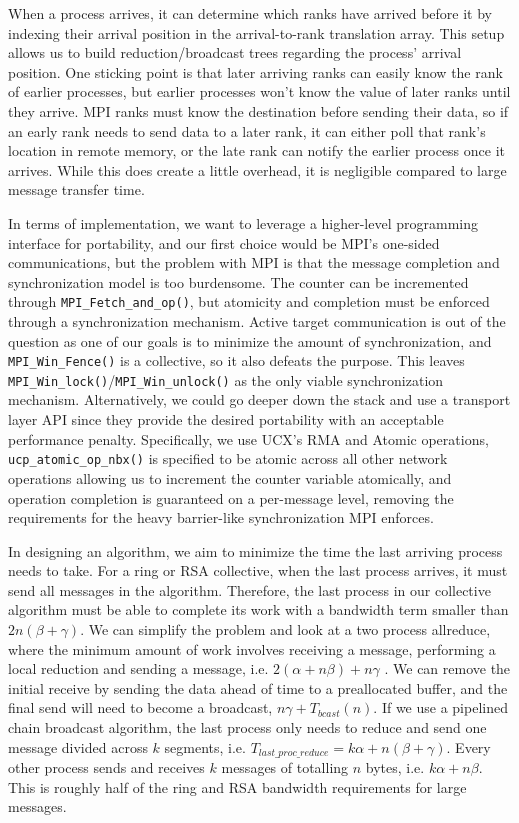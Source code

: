 When a process arrives, it can determine which ranks have arrived before it by indexing their arrival position in the arrival-to-rank translation array.
This setup allows us to build reduction/broadcast trees regarding the process' arrival position.
One sticking point is that later arriving ranks can easily know the rank of earlier processes, but earlier processes won't know the value of later ranks until they arrive.
MPI ranks must know the destination before sending their data, so if an early rank needs to send data to a later rank, it can either poll that rank's location in remote memory, or the late rank can notify the earlier process once it arrives.
While this does create a little overhead, it is negligible compared to large message transfer time.

In terms of implementation, we want to leverage a higher-level programming interface for portability, and our first choice would be MPI's one-sided communications, but the problem with MPI is that the message completion and synchronization model is too burdensome. 
The counter can be incremented through \texttt{MPI\_Fetch\_and\_op()}, but atomicity and completion must be enforced through a synchronization mechanism. 
Active target communication is out of the question as one of our goals is to minimize the amount of synchronization, and \texttt{MPI\_Win\_Fence()} is a collective, so it also defeats the purpose.
This leaves \texttt{MPI\_Win\_lock()}/\texttt{MPI\_Win\_unlock()} as the only viable synchronization mechanism.
Alternatively, we could go deeper down the stack and use a transport layer API since they provide the desired portability with an acceptable performance penalty.
Specifically, we use UCX's RMA and Atomic operations, \texttt{ucp\_atomic\_op\_nbx()} is specified to be atomic across all other network operations allowing us to increment the counter variable atomically, and operation completion is guaranteed on a per-message level, removing the requirements for the heavy barrier-like synchronization MPI enforces.

In designing an algorithm, we aim to minimize the time the last arriving process needs to take.
For a ring or RSA collective, when the last process arrives, it must send all messages in the algorithm.
Therefore, the last process in our collective algorithm must be able to complete its work with a bandwidth term smaller than $2n(\beta+\gamma)$. 
We can simplify the problem and look at a two process allreduce, where the minimum amount of work involves receiving a message, performing a local reduction and sending a message, i.e. $2(\alpha+n\beta)+n\gamma$ \cite{Marendic2016Clairvoyant}.
We can remove the initial receive by sending the data ahead of time to a preallocated buffer, and the final send will need to become a broadcast, $n\gamma+T_{bcast}(n)$. 
If we use a pipelined chain broadcast algorithm, the last process only needs to reduce and send one message divided across $k$ segments, i.e. $T_{last\_proc\_reduce}=k\alpha+n(\beta+\gamma)$.
Every other process sends and receives $k$ messages of totalling $n$ bytes, i.e. $k\alpha+n\beta$.
This is roughly half of the ring and RSA bandwidth requirements for large messages.

